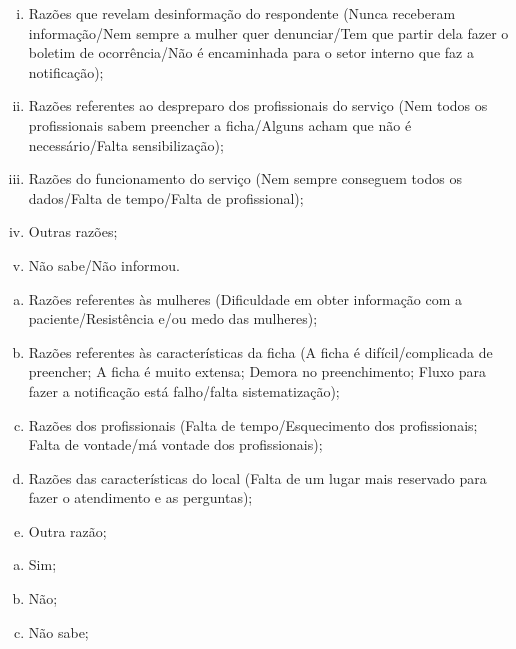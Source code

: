 \documentclass{article}
\begin{document}
\begin{enumerate}[i.]
\item
Razões que revelam desinformação do respondente (Nunca receberam informação/Nem
sempre a mulher quer denunciar/Tem que partir dela fazer o boletim de
ocorrência/Não é encaminhada para o setor interno que faz a notificação);

\item
Razões referentes ao despreparo dos profissionais do serviço (Nem todos os
profissionais sabem preencher a ficha/Alguns acham que não é necessário/Falta
sensibilização);

\item
Razões do funcionamento do serviço (Nem sempre conseguem todos os dados/Falta de
tempo/Falta de profissional);

\item
Outras razões;

\item
Não sabe/Não informou.

\end{enumerate}
\begin{enumerate}[a)]
\item
Razões referentes às mulheres (Dificuldade em obter informação com a
paciente/Resistência e/ou medo das mulheres);

\item
Razões referentes às características da ficha (A ficha é difícil/complicada de
preencher; A ficha é muito extensa; Demora no preenchimento; Fluxo para fazer a
notificação está falho/falta sistematização);

\item
Razões dos profissionais (Falta de tempo/Esquecimento dos profissionais; Falta
de vontade/má vontade dos profissionais);

\item
Razões das características do local (Falta de um lugar mais reservado para fazer
o atendimento e as perguntas);

\item
Outra razão;

\end{enumerate}
\begin{enumerate}[a)]
\item
Sim;

\item
Não;

\item
Não sabe;

\end{enumerate}
\end{document}

